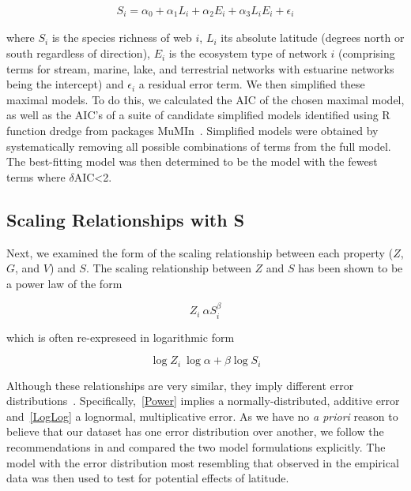 \documentclass[12pt]{article}
\begin{document}
\begin{eqnarray}
S_{i} = \alpha_{0} + \alpha_{1} L_{i} + \alpha_{2} E_{i} + \alpha_{3} L_{i} E_{i} + \epsilon_{i} 
\end{eqnarray}

where $S_{i}$ is the species richness of web $i$, $L_{i}$ its absolute
latitude (degrees north or south  regardless of direction), $E_{i}$ is the
ecosystem type of network $i$ (comprising terms for stream, marine, lake, and terrestrial networks with estuarine
networks being the intercept) and $\epsilon_{i}$ a residual error term. 
We then simplified these maximal models. To do this, we calculated the AIC
of the chosen maximal model, as well as the AIC's of a suite of candidate simplified models identified
using R~\citep{R} function dredge from packages MuMIn~\citep{MuMIn}. Simplified models were obtained by
systematically removing all possible combinations of terms from the full model.
The best-fitting model was then determined to be the model with the fewest terms where $\delta$AIC<2. 


\subsection*{Scaling Relationships with S}

Next, we examined the form of the scaling relationship between each 
property ($Z$, $G$, and $V$) and $S$. The scaling relationship between $Z$ and 
$S$ has been shown to be a power law \citep{Riede2010} of the form 

\begin{equation}
\label{Power}
Z_{i}~\alpha S_{i}^{\beta}
\end{equation}

which is often re-expreseed in logarithmic form 

\begin{equation}
\label{Loglog}
\log{Z_{i}} ~ \log{\alpha} + \beta\log{S_{i}}
\end{equation}


Although these relationships are very similar, they imply different error distributions~\citep{Xiao2011}.
Specifically,~\ref{Power} implies a normally-distributed, additive error and~\ref{LogLog} a lognormal,
multiplicative error. As we have no \emph{a priori} reason to believe that our dataset has one error distribution
over another, we follow the recommendations in \citet{Xiao2011} and compared the two
model formulations explicitly. The model with the error distribution most resembling that observed in the empirical
data was then used to test for potential effects of latitude.
\end{document}

